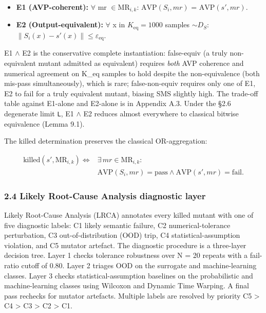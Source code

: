 \documentclass[review,12pt,authoryear]{elsarticle}
\providecommand{\tightlist}{\setlength{\itemsep}{0pt}\setlength{\parskip}{0pt}}
\begin{document}
\begin{itemize}
\tightlist
\item
  \textbf{E1 (AVP-coherent):} $\forall$ mr $\in \mathrm{MR}_{i,k}$: $\mathrm{AVP}(S_i, mr)$ =
  $\mathrm{AVP}(s', mr)$.
\item
  \textbf{E2 (Output-equivalent):} $\forall$ x in $K_{\mathrm{eq}}=1000$ samples
  $\sim D_S$: $\|S_i(x) - s'(x)\| \leq \varepsilon_{\mathrm{eq}}$.
\end{itemize}

E1 $\wedge$ E2 is the conservative complete instantiation: false-equiv (a
truly non-equivalent mutant admitted as equivalent) requires \emph{both}
AVP coherence and numerical agreement on K\_eq samples to hold despite the
non-equivalence (both mis-pass simultaneously), which is rare;
false-non-equiv requires only one of E1, E2 to fail for a truly equivalent
mutant, biasing SMS slightly high. The trade-off table against
E1-alone and E2-alone is in Appendix A.3. Under the §2.6 degenerate
limit \texttt{L}, E1 $\wedge$ E2 reduces almost everywhere to classical bitwise
equivalence (Lemma 9.1).

The killed determination preserves the classical OR-aggregation:

\[
\begin{aligned}
\mathrm{killed}(s', \mathrm{MR}_{i,k}) \iff{} & \exists\,mr \in \mathrm{MR}_{i,k}: \\
& \mathrm{AVP}(S_i, mr) = \text{pass} \wedge
  \mathrm{AVP}(s', mr) = \text{fail}.
\end{aligned}
\]

\subsubsection{2.4 Likely Root-Cause Analysis diagnostic layer}\label{lrca-engineering-attribution-layer-descriptive-not-in-sms}

Likely Root-Cause Analysis (LRCA) annotates every killed mutant with one
of five diagnostic labels: C1 likely semantic failure, C2
numerical-tolerance perturbation, C3 out-of-distribution (OOD) trip, C4
statistical-assumption violation, and C5 mutator artefact. The diagnostic
procedure is a three-layer decision tree.
Layer 1 checks tolerance robustness over N = 20 repeats with a
fail-ratio cutoff of 0.80. Layer 2 triages OOD on the surrogate and
machine-learning classes. Layer 3 checks statistical-assumption
baselines on the probabilistic and machine-learning classes using
Wilcoxon and Dynamic Time Warping. A final pass rechecks for mutator
artefacts. Multiple labels are resolved by priority C5 \textgreater{} C4
\textgreater{} C3 \textgreater{} C2 \textgreater{} C1.
\end{document}
